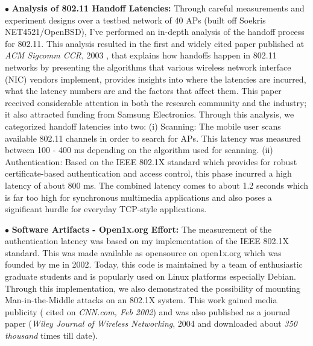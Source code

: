 \documentclass[11pt,letterpaper]{article}
\begin{document}

$\bullet$ {\bf Analysis of 802.11 Handoff Latencies:} Through careful measurements and experiment designs over
a testbed network  of 40 APs (built off Soekris NET4521/OpenBSD), I've performed an in-depth analysis of the handoff
process for 802.11. This analysis resulted in the first and  widely cited paper published at {\it ACM Sigcomm CCR},
2003 \cite{ccr-handoff}, that explains how handoffs happen in 802.11 networks by presenting the algorithms that various wireless network
interface (NIC) vendors implement, provides insights into where the latencies are incurred, what the latency numbers are
and the factors that affect them. This paper received considerable attention in both the research community and the
industry; it also attracted funding from Samsung Electronics.
Through this analysis, we categorized handoff latencies into two: (i) Scanning: The mobile user scans available 802.11
channels in order to search for APs. This latency was measured between 100 - 400 ms depending on the algorithm
used for scanning. (ii) Authentication: Based on the IEEE 802.1X standard which provides for robust certificate-based
authentication and access control,
this phase incurred a high latency of about 800 ms. The combined latency comes to about 1.2 seconds which is far
too high for synchronous multimedia applications and also poses a significant hurdle for everyday TCP-style
applications. 

$\bullet$ {\bf Software Artifacts - Open1x.org Effort:} The measurement of the authentication latency was based on my
implementation of the IEEE 802.1X standard.  This was made available as opensource on  open1x.org which was founded
by me in 2002. Today, this code is maintained by a team of enthusiastic  graduate students and is popularly used on Linux
platforms especially Debian. Through this implementation, we also demonstrated the possibility of mounting
Man-in-the-Middle attacks on an 802.1X system. This work gained media publicity ( cited on {\it CNN.com, Feb 2002}) and
was also published as a journal paper ({\it Wiley Journal of Wireless Networking}, 2004 \cite{security2004} and
downloaded about {\it 350 thousand} times till date). 
  
\end{document}
